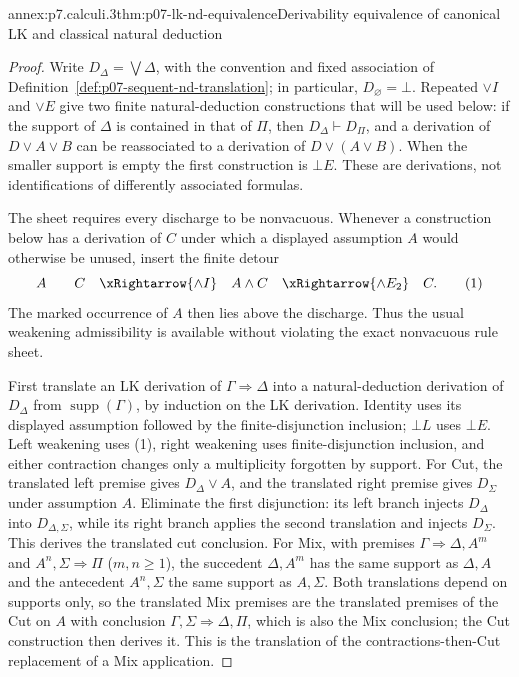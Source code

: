 \begin{annexitem}{annex:p7.calculi.3}{thm:p07-lk-nd-equivalence}{Derivability equivalence of canonical LK and classical natural deduction}
\begin{proof}
Write \(D_{\Delta}=\bigvee\Delta\), with the convention and fixed association
of Definition~\ref{def:p07-sequent-nd-translation}; in particular,
\(D_{\varnothing}=\bot\).  Repeated \(\lor I\) and \(\lor E\) give two finite
natural-deduction constructions that will be used below: if the support of
\(\Delta\) is contained in that of \(\Pi\), then
\(D_{\Delta}\vdash D_{\Pi}\), and a derivation of
\(D\lor A\lor B\) can be reassociated to a derivation of
\(D\lor(A\lor B)\).  When the smaller support is empty the first construction
is \(\bot E\).  These are derivations, not identifications of differently
associated formulas.

The sheet requires every discharge to be nonvacuous.  Whenever a construction
below has a derivation of \(C\) under which a displayed assumption \(A\) would
otherwise be unused, insert the finite detour
\[
 A\qquad C\quad\xRightarrow{\land I}\quad A\land C
 \quad\xRightarrow{\land E_2}\quad C.
 \tag{1}
\]
The marked occurrence of \(A\) then lies above the discharge.  Thus the usual
weakening admissibility is available without violating the exact nonvacuous
rule sheet.

First translate an LK derivation of \(\Gamma\Rightarrow\Delta\) into a
natural-deduction derivation of \(D_{\Delta}\) from
\(\operatorname{supp}(\Gamma)\), by induction on the LK derivation.  Identity
uses its displayed assumption followed by the finite-disjunction inclusion;
\(\bot L\) uses \(\bot E\).  Left weakening uses (1), right weakening uses
finite-disjunction inclusion, and either contraction changes only a
multiplicity forgotten by support.  For Cut, the translated left premise gives
\(D_{\Delta}\lor A\), and the translated right premise gives
\(D_{\Sigma}\) under assumption \(A\).  Eliminate the first disjunction:
its left branch injects \(D_{\Delta}\) into
\(D_{\Delta,\Sigma}\), while its right branch applies the second translation
and injects \(D_{\Sigma}\).  This derives the translated cut conclusion.
For Mix, with premises \(\Gamma\Rightarrow\Delta,A^{m}\) and
\(A^{n},\Sigma\Rightarrow\Pi\) (\(m,n\ge 1\)), the succedent
\(\Delta,A^{m}\) has the same support as \(\Delta,A\) and the antecedent
\(A^{n},\Sigma\) the same support as \(A,\Sigma\).  Both translations depend
on supports only, so the translated Mix premises are the translated
premises of the Cut on \(A\) with conclusion
\(\Gamma,\Sigma\Rightarrow\Delta,\Pi\), which is also the Mix conclusion; the
Cut construction then derives it.  This is the translation of the
contractions-then-Cut replacement of a Mix application.


\end{proof}
\end{annexitem}
